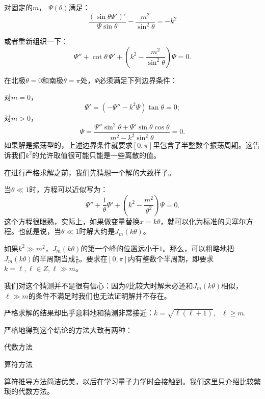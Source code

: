 \documentclass[CJK]{beamer}
\begin{document}
\begin{frame}
\bch
对固定的$m$， $\Psi(\theta)$满足：
$$ \frac{(\sin\theta \Psi')'}{\Psi\sin\theta}-\frac{m^2}{\sin^2\theta } = -k^2$$


或者重新组织一下：
$$ \Psi''+\cot\theta \,\Psi' +\left(k^2-\frac{m^2}{\sin^2\theta}\right) \Psi = 0. $$

\ech
\end{frame}

\begin{frame}
\bch

在北极$\theta=0$和南极$\theta=\pi$处，$\Psi$必须满足下列边界条件：

对$m=0$，
$$\Psi' =  (- \Psi''-k^2\Psi) \tan\theta = 0; $$
对$m>0$，
$$ \Psi = \frac{\Psi'' \sin^2\theta  + \Psi' \sin\theta\cos\theta }{m^2-k^2\sin^2\theta } =  0. $$
如果解是振荡型的，上述边界条件就要求$[0,\pi]$里包含了半整数个振荡周期。这告诉我们$k^2$的允许取值很可能只能是一些离散的值。
\ech
\end{frame}


\begin{frame}
\bch
在进行严格求解之前，我们先猜想一个解的大致样子。

当$\theta\ll 1$时，方程可以近似写为：
$$\Psi'' + \frac{1}{\theta}\Psi' + \left(k^2-\frac{m^2}{\theta^2}\right)\Psi = 0. $$
这个方程很眼熟，实际上，如果做变量替换$x=k\theta$，就可以化为标准的贝塞尔方程。也就是说，当$\theta\ll 1$时解大约是$J_m(k\theta)$。

\skipline

如果$k^2 \gg m^2$，$J_m(k\theta)$的第一个峰的位置远小于$1$。那么，可以粗略地把$J_m(k\theta)$的半周期当成$\frac{\pi}{k}$。要求在$[0,\pi]$内有整数个半周期，即要求$k = \ell, \ell \in Z, \ell \gg m$。

\skipline
我们对这个猜测并不是很有信心：因为$\theta$比较大时解未必还和$J_m(k\theta)$相似，$\ell \gg m$的条件不满足时我们也无法证明解并不存在。
\ech
\end{frame}


\begin{frame}
\bch
严格求解的结果却出乎意料地和猜测非常接近：{\blue $k = \sqrt{\ell(\ell+1)},\ \ \ \ell \ge m.$}

\skipline

严格地得到这个结论的方法大致有两种：
\bitem
\item{代数方法}
\item{算符方法}
  \eitem

算符推导方法简洁优美，以后在学习量子力学时会接触到。我们这里只介绍比较繁琐的代数方法。

\ech
\end{frame}
\end{document}
